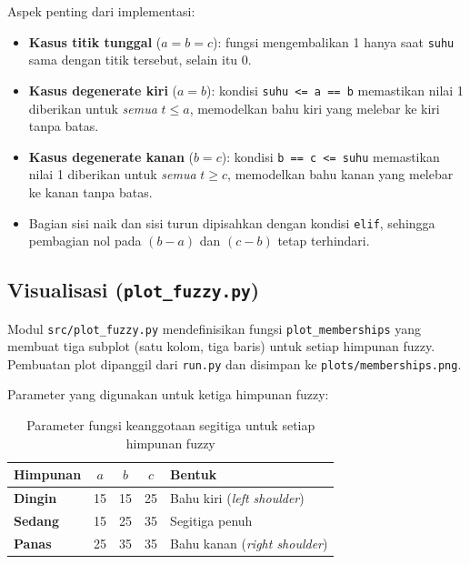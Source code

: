 \documentclass{article}
\begin{document}
Aspek penting dari implementasi:
\begin{itemize}
    \item \textbf{Kasus titik tunggal} ($a = b = c$): fungsi mengembalikan 1
      hanya saat \texttt{suhu} sama dengan titik tersebut, selain itu 0.
    \item \textbf{Kasus degenerate kiri} ($a = b$): kondisi \texttt{suhu <= a == b}
      memastikan nilai 1 diberikan untuk \emph{semua} $t \le a$, memodelkan bahu
      kiri yang melebar ke kiri tanpa batas.
    \item \textbf{Kasus degenerate kanan} ($b = c$): kondisi \texttt{b == c <= suhu}
      memastikan nilai 1 diberikan untuk \emph{semua} $t \ge c$, memodelkan bahu
      kanan yang melebar ke kanan tanpa batas.
    \item Bagian sisi naik dan sisi turun dipisahkan dengan kondisi \texttt{elif},
      sehingga pembagian nol pada $(b-a)$ dan $(c-b)$ tetap terhindari.
\end{itemize}

\subsection*{Visualisasi (\texttt{plot\_fuzzy.py})}

Modul \texttt{src/plot\_fuzzy.py} mendefinisikan fungsi \texttt{plot\_memberships} yang
membuat tiga subplot (satu kolom, tiga baris) untuk setiap himpunan fuzzy. Pembuatan
plot dipanggil dari \texttt{run.py} dan disimpan ke \texttt{plots/memberships.png}.

Parameter yang digunakan untuk ketiga himpunan fuzzy:

\begin{table}[htbp]
  \centering
  \caption{Parameter fungsi keanggotaan segitiga untuk setiap himpunan fuzzy}
  \begin{tabular}{>{\bfseries}l c c c l}
    \toprule
    \textbf{Himpunan} & $a$ & $b$ & $c$ & \textbf{Bentuk} \\
    \midrule
    Dingin & 15 & 15 & 25 & Bahu kiri (\textit{left shoulder}) \\
    Sedang & 15 & 25 & 35 & Segitiga penuh \\
    Panas  & 25 & 35 & 35 & Bahu kanan (\textit{right shoulder}) \\
    \bottomrule
  \end{tabular}
  \label{tab:params}
\end{table}

\end{document}
